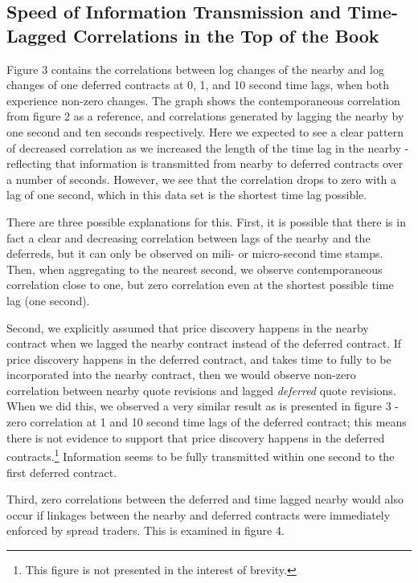 \documentclass[]{elsarticle} %
\begin{document}
\subsection{Speed of Information Transmission and Time-Lagged
Correlations in the Top of the
Book}\label{speed-of-information-transmission-and-time-lagged-correlations-in-the-top-of-the-book-1}

Figure 3 contains the correlations between log changes of the nearby and
log changes of one deferred contracts at 0, 1, and 10 second time lags,
when both experience non-zero changes. The graph shows the
contemporaneous correlation from figure 2 as a reference, and
correlations generated by lagging the nearby by one second and ten
seconds respectively. Here we expected to see a clear pattern of
decreased correlation as we increased the length of the time lag in the
nearby - reflecting that information is transmitted from nearby to
deferred contracts over a number of seconds. However, we see that the
correlation drops to zero with a lag of one second, which in this data
set is the shortest time lag possible.

There are three possible explanations for this. First, it is possible
that there is in fact a clear and decreasing correlation between lags of
the nearby and the deferreds, but it can only be observed on mili- or
micro-second time stamps. Then, when aggregating to the nearest second,
we observe contemporaneous correlation close to one, but zero
correlation even at the shortest possible time lag (one second).

Second, we explicitly assumed that price discovery happens in the nearby
contract when we lagged the nearby contract instead of the deferred
contract. If price discovery happens in the deferred contract, and takes
time to fully to be incorporated into the nearby contract, then we would
observe non-zero correlation between nearby quote revisions and lagged
\emph{deferred} quote revisions. When we did this, we observed a very
similar result as is presented in figure 3 - zero correlation at 1 and
10 second time lags of the deferred contract; this means there is not
evidence to support that price discovery happens in the deferred
contracts.\footnote{This figure is not presented in the interest of
  brevity.} Information seems to be fully transmitted within one second
to the first deferred contract.

Third, zero correlations between the deferred and time lagged nearby
would also occur if linkages between the nearby and deferred contracts
were immediately enforced by spread traders. This is examined in figure
4.
\end{document}

